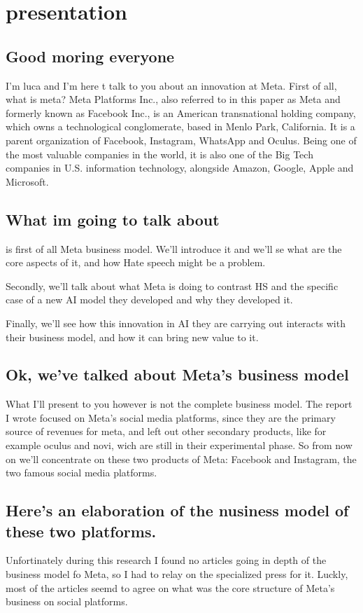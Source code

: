 \documentclass[11pt]{article}
\date{\today}
\title{}
\begin{document}
\tableofcontents

\section{presentation}
\label{sec:org82e75c1}
\subsection{Good moring everyone}
\label{sec:orga485dc0}
I'm luca and I'm here t talk to you about an innovation at Meta.
First of all, what is meta? Meta Platforms Inc., also referred to
in this paper as Meta and formerly known as Facebook Inc., is an
American transnational holding company, which owns a technological
conglomerate, based in Menlo Park, California. It is a parent
organization of Facebook, Instagram, WhatsApp and Oculus. Being one
of the most valuable companies in the world, it is also one of the
Big Tech companies in U.S. information technology, alongside
Amazon, Google, Apple and Microsoft.
\subsection{What im going to talk about}
\label{sec:orgfd0cf45}
is first of all Meta business model. We'll introduce it and we'll
se what are the core aspects of it, and how Hate speech might be a
problem.

Secondly, we'll talk about what Meta is doing to contrast HS and
the specific case of a new AI model they developed and why they
developed it.

Finally, we'll see how this innovation in AI they are carrying out
interacts with their business model, and how it can bring new value
to it.
\subsection{Ok, we've talked about Meta's business model}
\label{sec:orgded7882}
What I'll present to you however is not the complete business
model. The report I wrote focused on Meta's social media platforms,
since they are the primary source of revenues for meta, and left
out other secondary products, like for example oculus and novi,
wich are still in their experimental phase. So from now on we'll
concentrate on these two products of Meta: Facebook and Instagram,
the two famous social media platforms.
\subsection{Here's an elaboration of the nusiness model of these two platforms.}
\label{sec:orgea3d2a0}
Unfortinately during this research I found no articles going in
depth of the business model fo Meta, so I had to relay on the
specialized press for it. Luckly, most of the articles seemd to
agree on what was the core structure of Meta's business on social
platforms.
\end{document}
